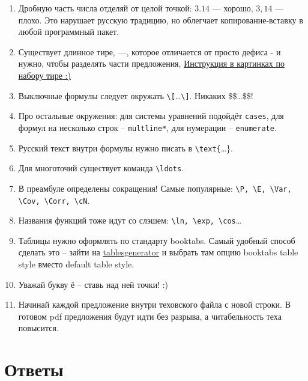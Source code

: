 \documentclass[12pt, a4paper]{article}
\DeclareMathOperator{\Var}{Var}
\DeclareMathOperator{\Cov}{Cov}
\DeclareMathOperator{\Corr}{Corr}
\DeclareMathOperator{\E}{\mathbb{E}}
\let\P\relax
\DeclareMathOperator{\P}{\mathbb{P}}
\newcommand{\cN}{\mathcal{N}}
\begin{document}
\begin{enumerate}

\item Дробную часть числа отделяй от целой точкой: $3.14$ — хорошо, $3{,}14$ — плохо.
Это нарушает русскую традицию, но облегчает копирование-вставку в любой программный пакет.
\item Существует длинное тире, —, которое отличается от просто дефиса - и нужно,
чтобы разделять части предложения, \href{https://ru.wikihow.com/напечатать-тире}{Инструкция в картинках по набору тире :)}
\item Выключные формулы следует окружать \verb|\[|\ldots\verb|\]|. Никаких \$\$\ldots\$\$!
\item Про остальные окружения: для системы уравнений подойдёт \verb|cases|, для формул на несколько строк – \verb|multline*|, для нумерации – \verb|enumerate|.
\item Русский текст внутри формулы нужно писать в \verb|\text{|\ldots\}.
\item Для многоточий существует команда \verb|\ldots|.
\item В преамбуле определены сокращения! Самые популярные: \verb|\P, \E, \Var, \Cov, \Corr, \cN|.
\item Названия функций тоже идут со слэшем: \verb|\ln, \exp, \cos|\ldots
\item Таблицы нужно оформлять по стандарту booktabs. Самый удобный способ сделать это – зайти на
\href{https://www.tablesgenerator.com}{tablesgenerator} и выбрать там опцию booktabs table style вместо default table style.
\item Уважай букву ё – ставь над ней точки! :)
\item Начинай каждой предложение внутри теховского файла с новой строки.
В готовом pdf предложения будут идти без разрыва, а читабельность теха повысится.
\end{enumerate}

\newpage




% 



\newpage


\newpage


\newpage


\newpage
\section{Ответы}





% 



% 

\end{document}
